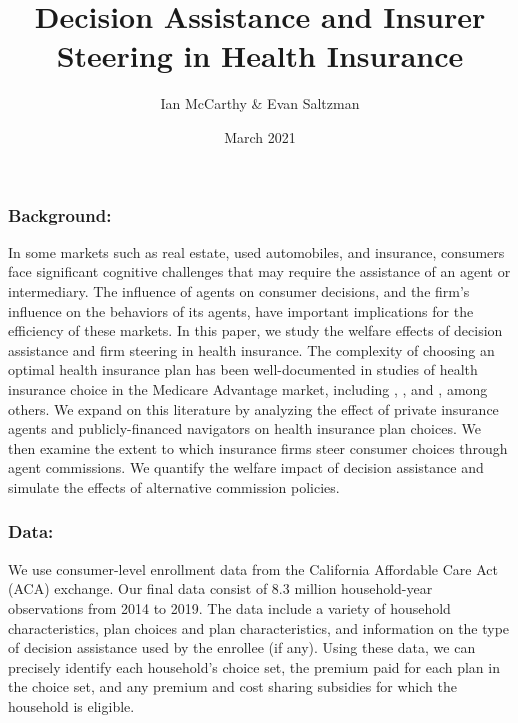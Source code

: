 \documentclass[12pt]{article}
\title{Decision Assistance and Insurer Steering in Health Insurance}
\author{Ian McCarthy \& Evan Saltzman}
\date{March 2021}
\begin{document}
\maketitle

\subsubsection{Background:}
In some markets such as real estate, used automobiles, and insurance, consumers face significant cognitive challenges that may require the assistance of an agent or intermediary. The influence of agents on consumer decisions, and the firm's influence on the behaviors of its agents, have important implications for the efficiency of these markets. In this paper, we study the welfare effects of decision assistance and firm steering in health insurance. The complexity of choosing an optimal health insurance plan has been well-documented in studies of health insurance choice in the Medicare Advantage market, including \cite{abaluck2011}, \cite{ketcham2012}, and \cite{gruber2017}, among others. We expand on this literature by analyzing the effect of private insurance agents and publicly-financed navigators on health insurance plan choices. We then examine the extent to which insurance firms steer consumer choices through agent commissions. We quantify the welfare impact of decision assistance and simulate the effects of alternative commission policies.


\subsubsection{Data:}
We use consumer-level enrollment data from the California Affordable Care Act (ACA) exchange. Our final data consist of 8.3 million household-year observations from 2014 to 2019. The data include a variety of household characteristics, plan choices and plan characteristics, and information on the type of decision assistance used by the enrollee (if any). Using these data, we can precisely identify each household's choice set, the premium paid for each plan in the choice set, and any premium and cost sharing subsidies for which the household is eligible.
\end{document}
